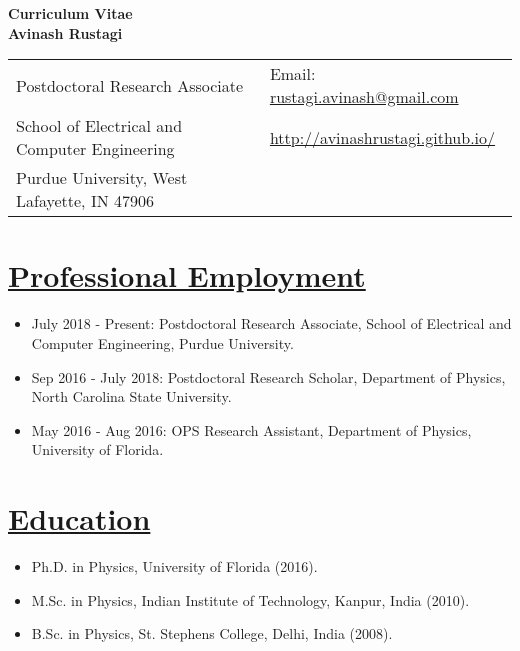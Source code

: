\documentclass[12pt]{article}
\providecommand*\email[1]{\href{mailto:#1}{#1}}
\begin{document}
\begin{center}
{\bf \Large Curriculum Vitae}\\
{\bf Avinash Rustagi}
\end{center}

\newlength{\rcollength}\setlength{\rcollength}{2.93in}
\begin{tabular}[t]{@{}p{\textwidth-\rcollength}p{\rcollength}}
Postdoctoral Research Associate & Email: \email{rustagi.avinash@gmail.com} \\ 
School of Electrical and Computer Engineering & \url{http://avinashrustagi.github.io/} \\ 
Purdue University, West Lafayette, IN 47906 & \\
\end{tabular} 

\renewcommand{\labelitemii}{$\cdot$}
\section*{\underline{Professional Employment}}
\begin{itemize}
\itemsep-0.05em
\item July 2018 - Present: Postdoctoral Research Associate, School of Electrical and Computer Engineering, Purdue University.

\item Sep 2016 - July 2018: Postdoctoral Research Scholar, Department of Physics, North Carolina State University. 

\item May 2016 - Aug 2016: OPS Research Assistant, Department of Physics, University of Florida.
\end{itemize}

\section*{\underline{Education}}
\begin{itemize}
\itemsep-0.05em
\item{Ph.D. in Physics, University of Florida (2016).}
\item{M.Sc. in Physics, Indian Institute of Technology, Kanpur, India (2010).}
\item{B.Sc. in Physics, St. Stephens College, Delhi, India (2008).}
\end{itemize}
\end{document}
